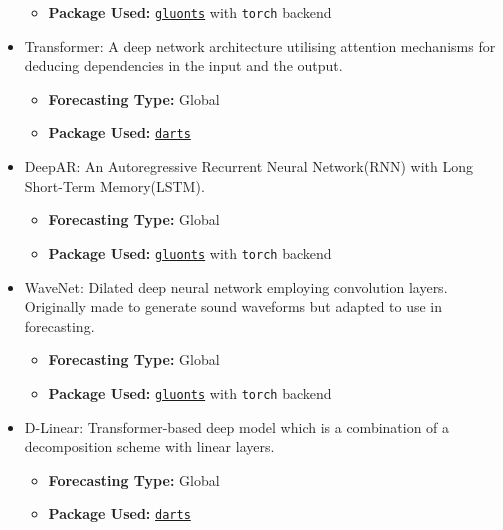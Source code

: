 \documentclass{article}
\begin{document}
\begin{itemize}
\begin{itemize}
        \item \textbf{Package Used: }\texttt{\href{https://ts.gluon.ai/stable/api/gluonts/gluonts.torch.model.simple_feedforward.html}{gluonts}} with \texttt{torch} backend
    \end{itemize}
    \item Transformer: A deep network architecture utilising attention mechanisms for deducing dependencies in the input and the output\cite{Vaswani2017}.
    \begin{itemize}
        \item \textbf{Forecasting Type: }Global
        \item \textbf{Package Used: }\texttt{\href{https://unit8co.github.io/darts/generated_api/darts.models.forecasting.transformer_model.html}{darts}}
    \end{itemize}
    \item DeepAR: An Autoregressive Recurrent Neural Network(RNN) with Long Short-Term Memory(LSTM).\cite{Salinas2020}
    \begin{itemize}
        \item \textbf{Forecasting Type: }Global
        \item \textbf{Package Used: }\texttt{\href{https://ts.gluon.ai/stable/api/gluonts/gluonts.torch.model.deepar.module.html}{gluonts}} with \texttt{torch} backend
    \end{itemize}
    \item WaveNet: Dilated deep neural network employing convolution layers. Originally made to generate sound waveforms\cite{Oord2016} but adapted to use in forecasting. %
    \begin{itemize}
        \item \textbf{Forecasting Type: }Global
        \item \textbf{Package Used: }\texttt{\href{https://ts.gluon.ai/stable/api/gluonts/gluonts.torch.model.wavenet.html}{gluonts}} with \texttt{torch} backend
    \end{itemize}
    \item D-Linear: Transformer-based deep model which is a combination of a decomposition scheme with linear layers\cite{Zeng2022}.
    \begin{itemize}
        \item \textbf{Forecasting Type: }Global
        \item \textbf{Package Used: }\texttt{\href{https://unit8co.github.io/darts/generated_api/darts.models.forecasting.dlinear.html}{darts}}

\end{itemize}
\end{itemize}
\end{document}
